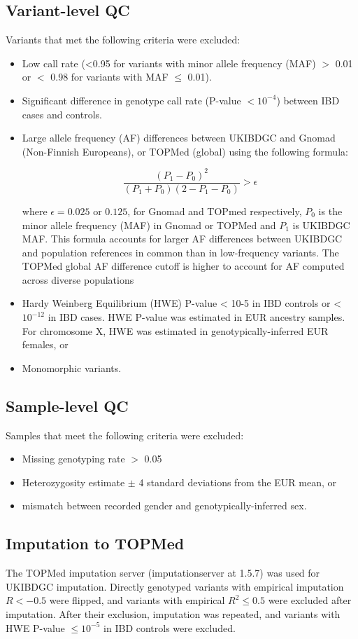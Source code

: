 \subsection{Variant-level QC}
Variants that met the following criteria were excluded: 
\begin{itemize}
  \item Low call rate (<0.95 for variants with minor allele frequency (MAF) $>$ 0.01 or $<$ 0.98 for variants with MAF $\leq$ 0.01).
  \item Significant difference in genotype call rate (P-value $< 10^{-4}$) between IBD cases and controls.
  \item Large allele frequency (AF) differences between UKIBDGC and Gnomad (Non-Finnish Europeans), or TOPMed (global) using the following formula:

$$\frac{(P_{1}-P_{0})^{2}}{(P_{1}+P_{0})(2-P_{1}-P_{0})} > \epsilon$$ 


where $\epsilon=0.025$ or $0.125$, for Gnomad and TOPmed respectively,  $P_{0}$ is the minor allele frequency (MAF) in Gnomad or TOPMed and $P_{1}$ is UKIBDGC MAF. This formula accounts for larger AF differences between UKIBDGC and population references in common than in low-frequency variants. The TOPMed global AF difference cutoff is higher to account for AF computed across diverse populations
\item Hardy Weinberg Equilibrium (HWE) P-value < 10-5 in IBD controls or < $10^{-12}$ in IBD cases. HWE P-value was estimated in EUR ancestry samples. For chromosome X, HWE was estimated in genotypically-inferred EUR females, or 
\item Monomorphic variants. 
\end{itemize}

\subsection{Sample-level QC}
Samples that meet the following criteria were excluded:
\begin{itemize}
\item Missing genotyping rate $>$ 0.05
\item Heterozygosity estimate $\pm$ 4 standard deviations from the EUR mean, or 
\item mismatch between recorded gender and genotypically-inferred sex. 
\end{itemize}
\subsection{Imputation to TOPMed}
The TOPMed imputation server (imputationserver at 1.5.7) was used for UKIBDGC imputation. Directly genotyped variants with empirical imputation $R < -0.5$ were flipped, and variants with empirical $R^{2} \leq 0.5$ were excluded after imputation. After their exclusion, imputation was repeated, and variants with HWE P-value $\leq 10^{-5}$ in IBD controls were excluded.

